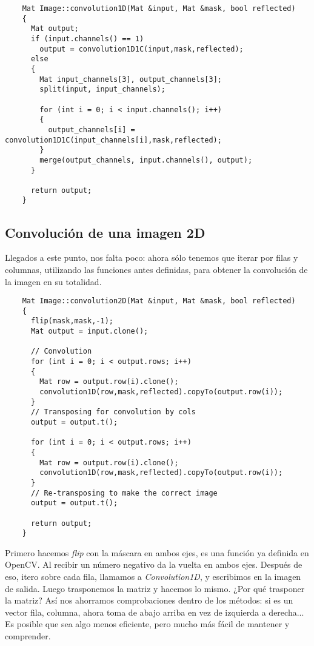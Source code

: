 \documentclass[a4paper, 11pt]{article}
\theoremstyle{definition}
\begin{document}
  \begin{lstlisting}
    Mat Image::convolution1D(Mat &input, Mat &mask, bool reflected)
    {
      Mat output;
      if (input.channels() == 1)
        output = convolution1D1C(input,mask,reflected);
      else
      {
        Mat input_channels[3], output_channels[3];
        split(input, input_channels);

        for (int i = 0; i < input.channels(); i++)
        {
          output_channels[i] = convolution1D1C(input_channels[i],mask,reflected);
        }
        merge(output_channels, input.channels(), output);
      }

      return output;
    }
  \end{lstlisting}

  \subsection{Convolución de una imagen 2D}

  Llegados a este punto, nos falta poco: ahora sólo tenemos que iterar por filas
  y columnas, utilizando las funciones antes definidas, para obtener la convolución
  de la imagen en su totalidad.

  \begin{lstlisting}
    Mat Image::convolution2D(Mat &input, Mat &mask, bool reflected)
    {
      flip(mask,mask,-1);
      Mat output = input.clone();

      // Convolution
      for (int i = 0; i < output.rows; i++)
      {
        Mat row = output.row(i).clone();
        convolution1D(row,mask,reflected).copyTo(output.row(i));
      }
      // Transposing for convolution by cols
      output = output.t();

      for (int i = 0; i < output.rows; i++)
      {
        Mat row = output.row(i).clone();
        convolution1D(row,mask,reflected).copyTo(output.row(i));
      }
      // Re-transposing to make the correct image
      output = output.t();

      return output;
    }
  \end{lstlisting}

  Primero hacemos \textit{flip} con la máscara en ambos ejes, es una función ya
  definida en OpenCV. Al recibir un número negativo da la vuelta en ambos ejes.
  Después de eso, itero sobre cada fila, llamamos a \textit{Convolution1D}, y escribimos
  en la imagen de salida. Luego trasponemos la matriz y hacemos lo mismo. ¿Por qué
  trasponer la matriz? Así nos ahorramos comprobaciones dentro de los métodos: si es
  un vector fila, columna, ahora toma de abajo arriba en vez de izquierda a derecha...
  Es posible que sea algo menos eficiente, pero mucho más fácil de mantener y comprender.\\
\end{document}
